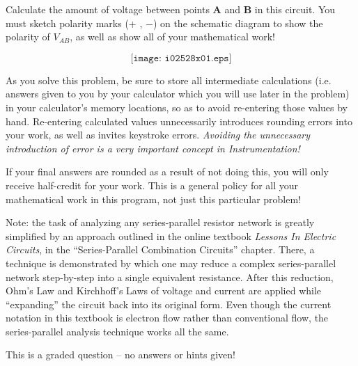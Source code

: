 

Calculate the amount of voltage between points {\bf A} and {\bf B} in this circuit.  You must sketch polarity marks (+ , $-$) on the schematic diagram to show the polarity of $V_{AB}$, as well as show all of your mathematical work!

$$\texttt{[image: i02528x01.eps]}$$

As you solve this problem, be sure to store all intermediate calculations (i.e. answers given to you by your calculator which you will use later in the problem) in your calculator's memory locations, so as to avoid re-entering those values by hand.  Re-entering calculated values unnecessarily introduces rounding errors into your work, as well as invites keystroke errors.  {\it Avoiding the unnecessary introduction of error is a very important concept in Instrumentation!}

If your final answers are rounded as a result of not doing this, you will only receive half-credit for your work.  This is a general policy for all your mathematical work in this program, not just this particular problem!

\vfil 

Note: the task of analyzing any series-parallel resistor network is greatly simplified by an approach outlined in the online textbook {\it Lessons In Electric Circuits}, in the ``Series-Parallel Combination Circuits'' chapter.  There, a technique is demonstrated by which one may reduce a complex series-parallel network step-by-step into a single equivalent resistance.  After this reduction, Ohm's Law and Kirchhoff's Laws of voltage and current are applied while ``expanding'' the circuit back into its original form.  Even though the current notation in this textbook is electron flow rather than conventional flow, the series-parallel analysis technique works all the same.

\eject






This is a graded question -- no answers or hints given!






